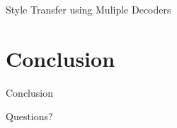 \documentclass[aspectratio=169]{beamer}
\begin{document}
\begin{frame}{Style Transfer using Muliple Decoders}
\end{frame}

% 

\section{Conclusion}

\begin{frame}{Conclusion}
\end{frame}

\begin{frame}[allowframebreaks]
	
	
\end{frame}

\begin{frame}
	\centering
	\Huge{Questions?}
\end{frame}
\end{document}
